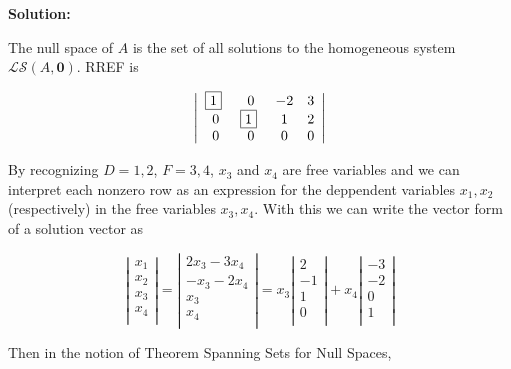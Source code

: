 \documentclass{article}
\begin{document}
\textbf{Solution:}

The null space of \(A\) is the set of all solutions to the homogeneous system \(\mathcal{LS}(A,\textbf{0})\).
RREF is

\begin{equation}
 \left| \begin{array}{ccccc}
  $\boxed{1}$~ & 0 & -2 & 3 \\
  0 & $\boxed{1}$~ & 1 & 2 \\
  0 & 0 & 0 & 0
  \end{array} \right|
\end{equation}

By recognizing \(D={1,2}\), \(F={3,4}\), \(x_3\) and \(x_4\) are free variables and we can interpret each nonzero row as an expression for the deppendent variables \(x_1,x_2\) (respectively) in the free variables \(x_3,x_4\).
With this we can write the vector form of a solution vector as

\begin{equation}
  \left| \begin{array}{ccccc}
    x_1 \\
    x_2 \\
    x_3 \\
    x_4 \\
  \end{array} \right|
=
\left| \begin{array}{ccccc}
  2x_3 - 3x_4 \\
  -x_3 - 2x_4 \\
  x_3 \\
  x_4 \\
\end{array} \right|
=
x_3
\left| \begin{array}{ccccc}
  2 \\
  -1 \\
  1 \\
  0 \\
\end{array} \right|
+
x_4
\left| \begin{array}{ccccc}
  -3 \\
  -2 \\
  0 \\
  1 \\
\end{array} \right|
\end{equation}

Then in the notion of Theorem Spanning Sets for Null Spaces,

\newcommand{\myzOne}{
  \left| \begin{array}{ccccc}
    2 \\
    -1 \\
    1 \\
    0 \\
  \end{array} \right|
}
\end{document}
